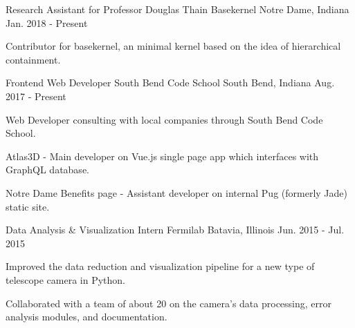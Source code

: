 \begin{cventries}
  \cventry
    {Research Assistant for Professor Douglas Thain}
    {Basekernel}
    {Notre Dame, Indiana}
    {Jan. 2018 - Present}
    {
      \begin{cvitems}
        \item {Contributor for basekernel, an minimal kernel based on the idea of hierarchical containment.}
      \end{cvitems}
    }
  \cventry
    {Frontend Web Developer}
    {South Bend Code School}
    {South Bend, Indiana}
    {Aug. 2017 - Present}
    {
      \begin{cvitems}
        \item {Web Developer consulting with local companies through South Bend Code School.}
        \item {Atlas3D - Main developer on Vue.js single page app which interfaces with GraphQL database.}
        \item {{Notre Dame Benefits page} - Assistant developer on internal Pug (formerly Jade) static site.}
      \end{cvitems}
    }
\iffalse
  \cventry
    {Donation Facilitator}
    {Notre Dame Alumni Center}
    {Notre Dame, Indiana}
    {Sep. 2016 - May. 2017}
    {
      \begin{cvitems}
        \item {Facilitated financial contributions to the University for various causes and campaigns.}
        \item {Exceeded the average amount of donations by more than 17\% in every report.}
      \end{cvitems}
    }
\fi
  \cventry
    {Data Analysis \& Visualization Intern}
    {Fermilab}
    {Batavia, Illinois}
    {Jun. 2015 - Jul. 2015}
    {
      \begin{cvitems}
        \item {Improved the data reduction and visualization pipeline for a new type
of telescope camera in Python.}
        \item {Collaborated with a team of about 20 on the camera’s data processing, error analysis modules, and documentation.}
      \end{cvitems}
    }
\end{cventries}

